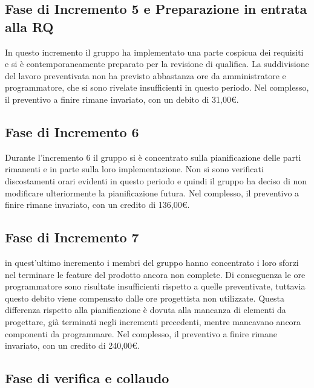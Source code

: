 \documentclass[../piano-di-progetto.tex]{subfiles}
\begin{document}
\subsection{Fase di Incremento 5 e Preparazione in entrata alla RQ}%
\label{sub:preventivo_a_finire/fase_di_incremento_5}

In questo incremento il gruppo ha implementato una parte cospicua dei requisiti e si è contemporaneamente preparato per la revisione di qualifica.
La suddivisione del lavoro preventivata non ha previsto abbastanza ore da amministratore e programmatore, che si sono rivelate insufficienti in questo periodo.
Nel complesso, il preventivo a finire rimane invariato, con un debito di 31,00€.

\subsection{Fase di Incremento 6}%
\label{sub:preventivo_a_finire/fase_di_incremento_6}

Durante l'incremento 6 il gruppo si è concentrato sulla pianificazione delle parti rimanenti e in parte sulla loro implementazione.
Non si sono verificati discostamenti orari evidenti in questo periodo e quindi il gruppo ha deciso di non modificare ulteriormente la pianificazione futura.
Nel complesso, il preventivo a finire rimane invariato, con un credito di 136,00€.


\subsection{Fase di Incremento 7}%
\label{sub:preventivo_a_finire/fase_di_incremento_7}

in quest'ultimo incremento i membri del gruppo hanno concentrato i loro sforzi nel terminare le feature del prodotto ancora non complete.
Di conseguenza le ore programmatore sono risultate insufficienti rispetto a quelle preventivate, tuttavia questo debito viene compensato dalle ore progettista non utilizzate.
Questa differenza rispetto alla pianificazione è dovuta alla mancanza di elementi da progettare, già terminati negli incrementi precedenti, mentre mancavano ancora componenti da programmare.
Nel complesso, il preventivo a finire rimane invariato, con un credito di 240,00€.

\subsection{Fase di verifica e collaudo}%
\label{sub:preventivo_a_finire/fase_di_incremento_4}
\end{document}
